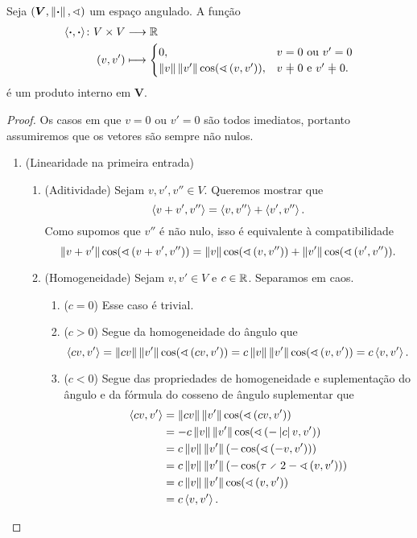 \begin{proposition}
Seja $(\bm V, \left\Vert{\bm{\cdot}}\right\Vert,\sphericalangle)$ um espaço angulado. A função
	\begin{align*}
		\func{\inte{\var}{\var}}{V \times V}{\R}{(v,v')}{
			\begin{cases}
				0, &\text{$v=0$ ou $v'=0$} \\
				\nor{v}\nor{v'}\cos(\ang{v}{v'}), &\text{$v \neq 0$ e $v' \neq 0$}.
			\end{cases}
		}
	\end{align*}
é um produto interno em $\bm V$.
\end{proposition}
\begin{proof}
Os casos em que $v=0$ ou $v'=0$ são todos imediatos, portanto assumiremos que os vetores são sempre não nulos.
	\begin{enumerate}
		\item (Linearidade na primeira entrada)
			\begin{enumerate}
				\item (Aditividade) Sejam $v,v',v'' \in V$. Queremos mostrar que
					\begin{equation*}
						\left\langle{v+v'},{v''}\right\rangle = \left\langle{v},{v''}\right\rangle + \left\langle{v'},{v''}\right\rangle.
					\end{equation*}
				Como supomos que $v''$ é não nulo, isso é equivalente à compatibilidade
					\begin{equation*}
						\left\Vert{v+v'}\right\Vert\cos(\sphericalangle\left({v+v'},{v''}\right)) = \left\Vert{v}\right\Vert\cos(\sphericalangle\left({v},{v''}\right)) + \left\Vert{v'}\right\Vert\cos(\sphericalangle\left({v'},{v''}\right)).
					\end{equation*}
				
				\item (Homogeneidade) Sejam $v,v' \in V$ e $c \in \mathbb{R}$. Separamos em caos.
					\begin{enumerate}
						\item ($c=0$) Esse caso é trivial.
						\item ($c>0$) Segue da homogeneidade do ângulo que
							\begin{equation*}
								\left\langle{cv},{v'}\right\rangle = \left\Vert{cv}\right\Vert\left\Vert{v'}\right\Vert\cos(\sphericalangle\left({cv},{v'}\right)) = c\left\Vert{v}\right\Vert\left\Vert{v'}\right\Vert\cos(\sphericalangle\left({v},{v'}\right)) = c\left\langle{v},{v'}\right\rangle.
							\end{equation*}
						\item ($c<0$) Segue das propriedades de homogeneidade e suplementação do ângulo e da fórmula do cosseno de ângulo suplementar que
							\begin{align*}
								\inte{cv}{v'} &= \nor{cv}\nor{v'}\cos(\ang{cv}{v'}) \\
									&= -c\nor{v}\nor{v'}\cos(\ang{-\abs{c}v}{v'}) \\
									&= c\nor{v}\nor{v'}(-\cos(\ang{-v}{v'})) \\
									&= c\nor{v}\nor{v'}(-\cos(\tau \div 2 - \ang{v}{v'})) \\
									&= c\nor{v}\nor{v'}\cos(\ang{v}{v'}) \\
									&= c\inte{v}{v'}.
							\end{align*}
					\end{enumerate}
			\end{enumerate}
	

\end{enumerate}
\end{proof}
